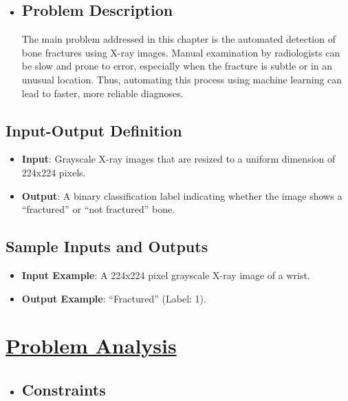 \documentclass[11pt]{article}
\begin{document}
\begin{itemize}
     
\item\subsection*{Problem Description}\label{problem-description}

The main problem addressed in this chapter is the automated detection of
bone fractures using X-ray images. Manual examination by radiologists
can be slow and prone to error, especially when the fracture is subtle
or in an unusual location. Thus, automating this process using machine
learning can lead to faster, more reliable diagnoses.

\end{itemize}

\subsection*{Input-Output Definition}\label{input-output-definition}

\begin{itemize}
\item
  \textbf{Input}: Grayscale X-ray images that are resized to a uniform
  dimension of 224x224 pixels.
\item
  \textbf{Output}: A binary classification label indicating whether the
  image shows a ``fractured'' or ``not fractured'' bone.
\end{itemize}

\subsection*{Sample Inputs and Outputs}\label{sample-inputs-and-outputs}

\begin{itemize}
\item
  \textbf{Input Example}: A 224x224 pixel grayscale X-ray image of a
  wrist.
\item
  \textbf{Output Example}: ``Fractured'' (Label: 1).
\end{itemize}

\section*{\Large\underline{\textbf{Problem Analysis}}}\label{references}
\begin{itemize}
    \item\subsection*{Constraints}\label{constraints}
    
\end{itemize}
\end{document}
